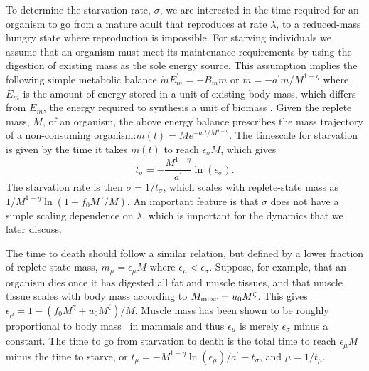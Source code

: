 \documentclass[twocolumn,preprintnumbers,amsmath,amssymb,superscriptaddress]{revtex4}
\begin{document}
\begin{bibunit}[unsrt]
{To determine the starvation rate, $\sigma$, we are interested in the time
required for an organism to go from a mature adult that reproduces at rate
$\lambda$, to a
reduced-mass hungry state where reproduction is impossible.  For starving individuals we assume that an organism must meet its maintenance requirements by using the digestion of existing mass as the sole energy source.
This assumption implies the following simple metabolic balance
$\dot{m}E_{m}^{\prime}=-B_{m}m$ or $\dot{m}=-a^{\prime}m/M^{1-\eta}$
where $E_{m}^{\prime}$ is the amount of energy stored in a unit of existing
body mass, which differs from $E_{m}$, the energy required to
synthesis a unit of biomass \citep{hou}. Given the replete mass, $M$, of an organism, the
above energy balance prescribes the mass trajectory of a non-consuming
organism:$m\left(t\right)=Me^{-a^{\prime}t/M^{1-\eta}}$.
The timescale for starvation is
given by the time it takes $m(t)$ to reach $\epsilon_{\sigma} M$, which gives
\begin{equation}
\label{eq:sigma}
t_{\sigma}=-\frac{M^{1-\eta}}{a^{\prime}}\ln\left(\epsilon_{\sigma}\right).
\end{equation}
The starvation rate is then $\sigma=1/t_{\sigma}$, which scales with
replete-state mass as $1/M^{1-\eta}\ln\left(1-f_{0}M^{\gamma}/M\right)$.  An important
feature is that $\sigma$ does not have a simple scaling dependence on
$\lambda$, which is important for the dynamics that we
later discuss.

The time to death should follow a similar relation, but defined by a lower
fraction of replete-state mass, $m_{\mu}=\epsilon_{\mu} M$ where $\epsilon_\mu < \epsilon_\sigma$.
Suppose, for example, that an organism dies once it has digested all fat and
muscle tissues, and that muscle tissue scales with body mass according to
$M_{\rm musc}=u_{0}M^{\zeta}$.  This gives
$\epsilon_{\mu}=1-\left(f_{0}M^{\gamma}+u_{0}M^{\zeta}\right)/M$. Muscle
mass has been shown to be roughly proportional to body mass~\citep{Folland:2008ij} in
mammals and thus $\epsilon_{\mu}$ is merely $\epsilon_{\sigma}$ minus a constant. The time to go from starvation to death is the total time to reach $\epsilon_{\mu}M$ minus the time to starve, or $t_{\mu}=-M^{1-\eta}\ln\left(\epsilon_{\mu}\right)/a^{\prime}-t_{\sigma}$,
and $\mu=1/t_{\mu}$.
}

\putbib[aa_starving3]



\end{bibunit}
\end{document}
